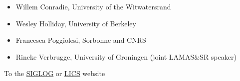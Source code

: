 \documentclass[prodmode,acmtecs]{acmsmall} %
\begin{document}
\begin{itemize}
\begin{itemize}\item  Willem Conradie, University of the Witwatersrand 
\item  Wesley Holliday, University of Berkeley 
\item  Francesca Poggiolesi, Sorbonne and CNRS 
\item  Rineke Verbrugge, University of Groningen (joint LAMAS\&SR speaker)
\end{itemize} 
\end{itemize}


To the \href{http://siglog.org/}{SIGLOG} or \href{https://lics.siglog.org}{LICS} website
\end{document}
